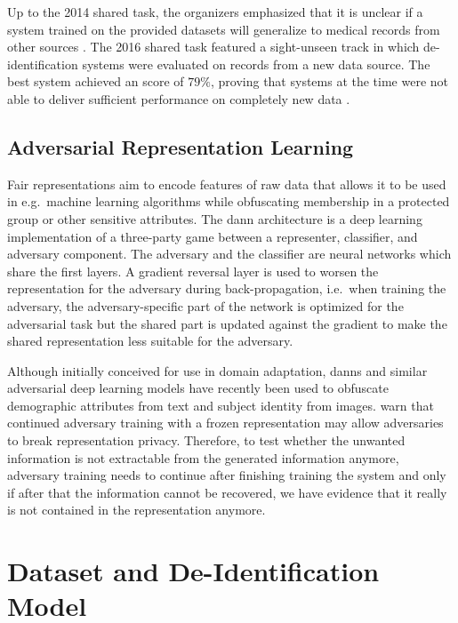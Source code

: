 %
Up to the 2014 shared task, the organizers emphasized that it is unclear if a system trained on the provided datasets will generalize to medical records from other sources \citep{uzuner2007evaluating,stubbs2015automated}.
%
The 2016 shared task featured a sight-unseen track in which de-identification systems were evaluated on records from a new data source.
%
The best system achieved an \fone score of $79\%$, proving that systems at the time were not able to deliver sufficient performance on completely new data \citep{stubbs2017identification}.

\subsection{Adversarial Representation Learning}
%
Fair representations \citep{zemel2013learning,hamm2015preserving} aim to encode features of raw data that allows it to be used in e.g.\ machine learning algorithms while obfuscating membership in a protected group or other sensitive attributes.
%
The \ac{dann} architecture \citep{ganin2016domain} is a deep learning implementation of a three-party game between a representer, classifier, and adversary component.
%
The adversary and the classifier are neural networks which share the first layers.
%
A gradient reversal layer is used to worsen the representation for the adversary during back-propagation, i.e.\ when training the adversary, the adversary-specific part of the network is optimized for the adversarial task but the shared part is updated against the gradient to make the shared representation less suitable for the adversary.

%
Although initially conceived for use in domain adaptation, \acp{dann} and similar adversarial deep learning models have recently been used to obfuscate demographic attributes from text \citep{elazar2018adversarial,li2018towards} and subject identity \citep{feutry2018learning} from images.
%
\citet{elazar2018adversarial} warn that continued adversary training with a frozen representation may allow adversaries to break representation privacy. Therefore, to test whether the unwanted information is not extractable from the generated information anymore, adversary training needs to continue after finishing training the system and only if after that the information cannot be recovered, we have evidence that it really is not contained in the representation anymore.

\section{Dataset and De-Identification Model}\label{sec:deidentification-model}

